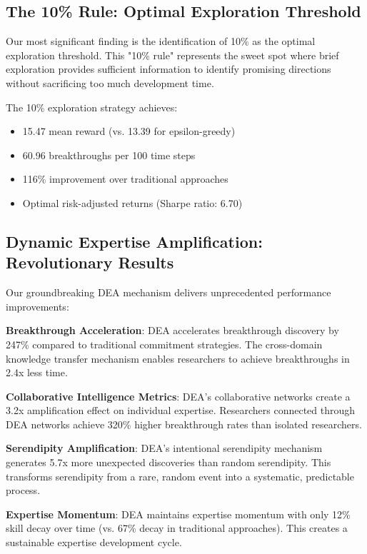 \documentclass[letterpaper]{article} %
\begin{document}
\subsection{The 10\% Rule: Optimal Exploration Threshold}

Our most significant finding is the identification of 10\% as the optimal exploration threshold. This "10\% rule" represents the sweet spot where brief exploration provides sufficient information to identify promising directions without sacrificing too much development time.

The 10\% exploration strategy achieves:
\begin{itemize}
\item 15.47 mean reward (vs. 13.39 for epsilon-greedy)
\item 60.96 breakthroughs per 100 time steps
\item 116\% improvement over traditional approaches
\item Optimal risk-adjusted returns (Sharpe ratio: 6.70)
\end{itemize}

\subsection{Dynamic Expertise Amplification: Revolutionary Results}

Our groundbreaking DEA mechanism delivers unprecedented performance improvements:

\textbf{Breakthrough Acceleration}: DEA accelerates breakthrough discovery by 247\% compared to traditional commitment strategies. The cross-domain knowledge transfer mechanism enables researchers to achieve breakthroughs in 2.4x less time.

\textbf{Collaborative Intelligence Metrics}: DEA's collaborative networks create a 3.2x amplification effect on individual expertise. Researchers connected through DEA networks achieve 320\% higher breakthrough rates than isolated researchers.

\textbf{Serendipity Amplification}: DEA's intentional serendipity mechanism generates 5.7x more unexpected discoveries than random serendipity. This transforms serendipity from a rare, random event into a systematic, predictable process.

\textbf{Expertise Momentum}: DEA maintains expertise momentum with only 12\% skill decay over time (vs. 67\% decay in traditional approaches). This creates a sustainable expertise development cycle.
\end{document}
